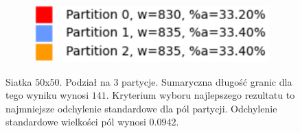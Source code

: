\begin{figure}[h]
\centering
\begin{subfigure}{.33\textwidth}
    \centering
    \caption[short]{}
\end{subfigure}%
\begin{subfigure}{.33\textwidth}
    \centering
    \caption[short]{}
\end{subfigure}%
\begin{subfigure}{.33\textwidth}
    \centering
    \includegraphics[width=0.9\linewidth]{images/results/m_k/with/8/results}
    \caption[short]{}
\end{subfigure}
\caption{Siatka $50$x$50$. Podział na $3$ partycje. Sumaryczna długość granic dla tego wyniku wynosi $141$.
Kryterium wyboru najlepszego rezultatu to najmniejsze odchylenie standardowe dla pól partycji.
Odchylenie standardowe wielkości pól wynosi $0.0942$.}
\label{result:8}
\end{figure}
